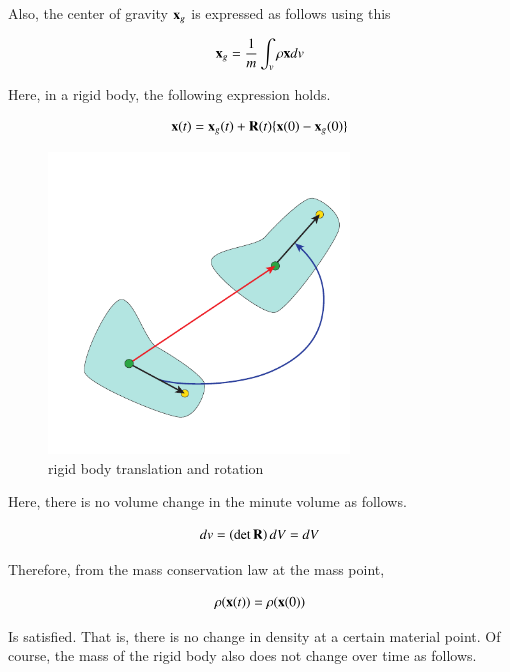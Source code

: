 Also, the center of gravity $\mathbf{x}_g$ is expressed as follows using this

\begin{equation}
\mathbf{x}_g = \frac{1}{m}\int_v\rho \mathbf{x} dv
\end{equation}

Here, in a rigid body, the following expression holds.

\begin{tcolorbox}[title=material point positioin on a rigid body]
\begin{equation}
\mathbf{x}(t) = \mathbf{x}_g(t) + \mathbf{R}(t)\{\mathbf{x}(0) - \mathbf{x}_g(0)\}
\end{equation}
\end{tcolorbox}

\begin{figure}
\begin{center}
\includegraphics[width=80mm]{images/RigidTransRot.pdf}
\caption{rigid body translation and rotation}
\end{center}
\end{figure}



Here, there is no volume change in the minute volume as follows.

\begin{equation}
dv = \left(\det\mathbf{R}\right)dV = dV
\end{equation}

Therefore, from the mass conservation law at the mass point,

\begin{equation}
\rho(\mathbf{x}(t)) = \rho(\mathbf{x}(0))
\end{equation}

Is satisfied. That is, there is no change in density at a certain material point. Of course, the mass of the rigid body also does not change over time as follows.

